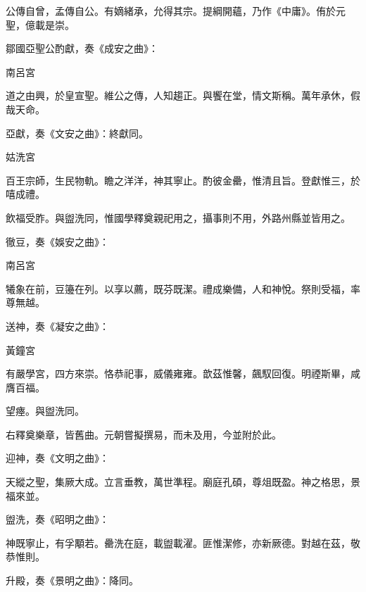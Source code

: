 \begin{pinyinscope}
 公傳自曾，孟傳自公。有嫡緒承，允得其宗。提綱開蘊，乃作《中庸》。侑於元聖，億載是崇。



 鄒國亞聖公酌獻，奏《成安之曲》：



 南呂宮



 道之由興，於皇宣聖。維公之傳，人知趨正。與饗在堂，情文斯稱。萬年承休，假哉天命。



 亞獻，奏《文安之曲》：終獻同。



 姑洗宮



 百王宗師，生民物軌。瞻之洋洋，神其寧止。酌彼金罍，惟清且旨。登獻惟三，於嘻成禮。



 飲福受胙。與盥洗同，惟國學釋奠親祀用之，攝事則不用，外路州縣並皆用之。



 徹豆，奏《娛安之曲》：



 南呂宮



 犧象在前，豆籩在列。以享以薦，既芬既潔。禮成樂備，人和神悅。祭則受福，率尊無越。



 送神，奏《凝安之曲》：



 黃鐘宮



 有嚴學宮，四方來崇。恪恭祀事，威儀雍雍。歆茲惟馨，飆馭回復。明禋斯畢，咸膺百福。



 望瘞。與盥洗同。



 右釋奠樂章，皆舊曲。元朝嘗擬撰易，而未及用，今並附於此。



 迎神，奏《文明之曲》：



 天縱之聖，集厥大成。立言垂教，萬世準程。廟庭孔碩，尊俎既盈。神之格思，景福來並。



 盥洗，奏《昭明之曲》：



 神既寧止，有孚顒若。罍洗在庭，載盥載濯。匪惟潔修，亦新厥德。對越在茲，敬恭惟則。



 升殿，奏《景明之曲》：降同。




\end{pinyinscope}
